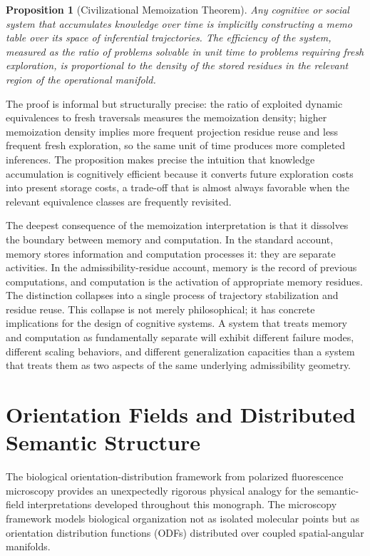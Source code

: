\documentclass[12pt, a4paper, openany]{book}
\theoremstyle{plain}
\newtheorem{proposition}[theorem]{Proposition}
\theoremstyle{definition}
\theoremstyle{remark}
\begin{document}
\begin{proposition}[Civilizational Memoization Theorem]
Any cognitive or social system that accumulates knowledge over time is implicitly constructing a memo table over its space of inferential trajectories. The efficiency of the system, measured as the ratio of problems solvable in unit time to problems requiring fresh exploration, is proportional to the density of the stored residues in the relevant region of the operational manifold.
\end{proposition}

The proof is informal but structurally precise: the ratio of exploited dynamic equivalences to fresh traversals measures the memoization density; higher memoization density implies more frequent projection residue reuse and less frequent fresh exploration, so the same unit of time produces more completed inferences. The proposition makes precise the intuition that knowledge accumulation is cognitively efficient because it converts future exploration costs into present storage costs, a trade-off that is almost always favorable when the relevant equivalence classes are frequently revisited.

The deepest consequence of the memoization interpretation is that it dissolves the boundary between memory and computation. In the standard account, memory stores information and computation processes it: they are separate activities. In the admissibility-residue account, memory is the record of previous computations, and computation is the activation of appropriate memory residues. The distinction collapses into a single process of trajectory stabilization and residue reuse. This collapse is not merely philosophical; it has concrete implications for the design of cognitive systems. A system that treats memory and computation as fundamentally separate will exhibit different failure modes, different scaling behaviors, and different generalization capacities than a system that treats them as two aspects of the same underlying admissibility geometry.

\section{Orientation Fields and Distributed Semantic Structure}

The biological orientation-distribution framework from polarized fluorescence microscopy provides an unexpectedly rigorous physical analogy for the semantic-field interpretations developed throughout this monograph. The microscopy framework models biological organization not as isolated molecular points but as orientation distribution functions (ODFs) distributed over coupled spatial-angular manifolds.
\end{document}
